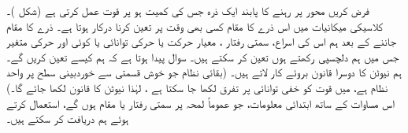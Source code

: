 فرض کریں   محور     پر رہنے کا  پابند ایک ذرہ  جس کی   کمیت   ہو  پر قوت  عمل کرتی ہے  (شکل )۔ کلاسیکی میکانیات میں اس ذرے کا مقام   کسی بھی وقت  پر تعین کرنا درکار ہوتا ہے۔ ذرے کا مقام جاننے کے بعد ہم اس کی اسراع، سمتی رفتار  ، معیار حرکت   یا حرکی توانائی   یا کوئی اور حرکی متغیر جس میں ہم دلچسپی رکھتے ہوں تعین کر سکتے ہیں۔  سوال پیدا ہوتا ہے کہ ہم  کیسے تعین  کریں گے۔ ہم نیوٹن کا دوسرا قانون    بروئے کار لاتے ہیں۔ (بقائی نظام جو خوش قسمتی سے خوردبینی سطح پر واحد نظام ہے، میں قوت کو خفی توانائی پر تفرق لکھا جا سکتا ہے ،  لہٰذا نیوٹن کا قانون   لکھا جائے گا۔)   اس مساوات کے ساتھ ابتدائی معلومات، جو عموماً لمحہ  پر سمتی رفتار یا مقام ہوں گے، استعمال کرتے ہوئے ہم   دریافت کر سکتے ہیں۔
 
